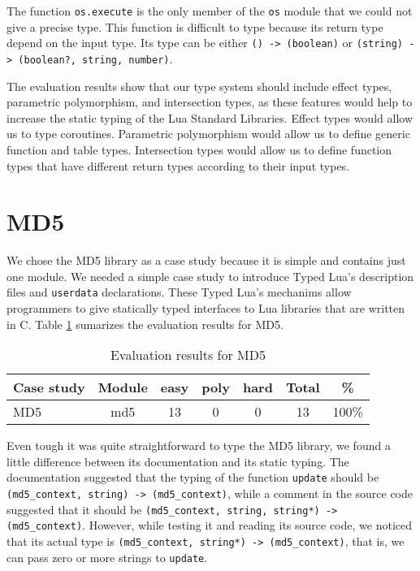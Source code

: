 The function \texttt{os.execute} is the only member of the \texttt{os}
module that we could not give a precise type.
This function is difficult to type because its return type depend on
the input type.
Its type can be either \texttt{() -> (boolean)} or
\texttt{(string) -> (boolean?, string, number)}.

The evaluation results show that our type system should include effect
types, parametric polymorphism, and intersection types, as these
features would help to increase the static typing of the Lua Standard Libraries.
Effect types would allow us to type coroutines.
Parametric polymorphism would allow us to define generic function and table types.
Intersection types would allow us to define function types that have
different return types according to their input types.

\section{MD5}

We chose the MD5 library \citep{lmd5} as a case study because it is
simple and contains just one module.
We needed a simple case study to introduce Typed Lua's description
files and \texttt{userdata} declarations.
These Typed Lua's mechanims allow programmers to give statically typed
interfaces to Lua libraries that are written in C.
Table \ref{tab:evalmd5} sumarizes the evaluation results for MD5.

\begin{table}[!ht]
\begin{center}
\begin{tabular}{|l|c|c|c|c|c|c|}
\hline
\textbf{Case study} & \textbf{Module} & \textbf{easy} & \textbf{poly} & \textbf{hard} & \textbf{Total} & \textbf{\%} \\
\hline
\multirow{1}{*}{MD5}
& md5 & 13 & 0 & 0 & 13 & 100\% \\
\hline
\end{tabular}
\end{center}
\caption{Evaluation results for MD5}
\label{tab:evalmd5}
\end{table}

Even tough it was quite straightforward to type the MD5 library,
we found a little difference between its documentation and its static typing.
The documentation suggested that the typing of the function \texttt{update}
should be \texttt{(md5\string_context, string) -> (md5\string_context)},
while a comment in the source code suggested that it should be
\texttt{(md5\string_context, string, string*) -> (md5\string_context)}.
However, while testing it and reading its source code, we noticed that
its actual type is \texttt{(md5\string_context, string*) -> (md5\string_context)},
that is, we can pass zero or more strings to \texttt{update}.

